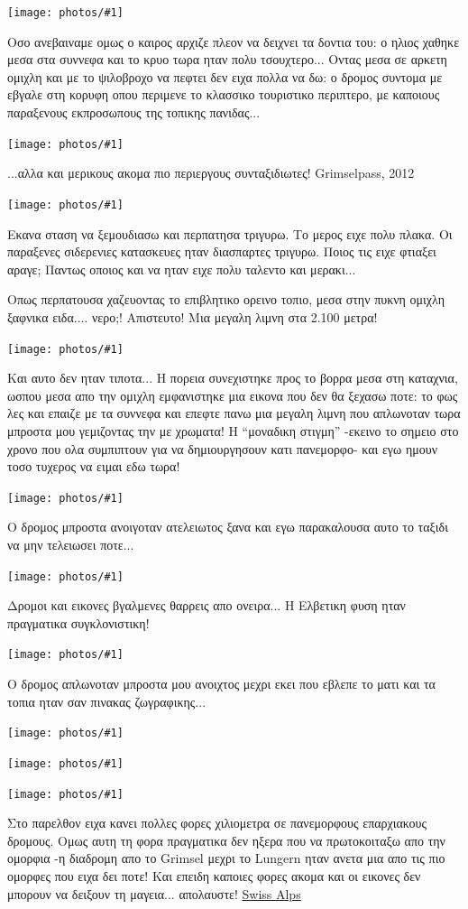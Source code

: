 \documentclass[11pt, letterpaper]{book}
\newcommand\photo[1]{\begin{center}\noindent\texttt{[image: photos/\#1]}\end{center}}
\begin{document}
\photo{63.jpg}

Οσο ανεβαιναμε ομως ο καιρος αρχιζε πλεον να δειχνει τα δοντια του: ο ηλιος χαθηκε μεσα στα συννεφα και το κρυο τωρα ηταν πολυ τσουχτερο... 
Οντας μεσα σε αρκετη ομιχλη και με το ψιλοβροχο να πεφτει δεν ειχα πολλα να δω: ο δρομος συντομα με εβγαλε στη κορυφη οπου περιμενε το κλασσικο τουριστικο περιπτερο, με καποιους παραξενους εκπροσωπους της τοπικης πανιδας...

\photo{64.jpg}

...αλλα και μερικους ακομα πιο περιεργους συνταξιδιωτες!
Grimselpass, 2012

\photo{65.jpg}

Εκανα σταση να ξεμουδιασω και περπατησα τριγυρω. Το μερος ειχε πολυ πλακα. Οι παραξενες σιδερενιες κατασκευες ηταν διασπαρτες τριγυρω. Ποιος τις ειχε φτιαξει αραγε; Παντως οποιος και να ηταν ειχε πολυ ταλεντο και μερακι...

Οπως περπατουσα χαζευοντας το επιβλητικο ορεινο τοπιο, μεσα στην πυκνη ομιχλη ξαφνικα ειδα.... νερο;! Απιστευτο! Μια μεγαλη λιμνη στα 2.100 μετρα! 

\photo{66.jpg}

Και αυτο δεν ηταν τιποτα...
Η πορεια συνεχιστηκε προς το βορρα μεσα στη καταχνια, ωσπου μεσα απο την ομιχλη εμφανιστηκε μια εικονα που δεν θα ξεχασω ποτε: το φως λες και επαιζε με τα συννεφα και επεφτε πανω μια μεγαλη λιμνη που απλωνοταν τωρα μπροστα μου γεμιζοντας την με χρωματα! 
Η ``μοναδικη στιγμη'' -εκεινο το σημειο στο χρονο που ολα συμπιπτουν για να δημιουργησουν κατι πανεμορφο- και εγω ημουν τοσο τυχερος να ειμαι εδω τωρα!

\photo{67.jpg}

Ο δρομος μπροστα ανοιγοταν ατελειωτος ξανα και εγω παρακαλουσα αυτο το ταξιδι να μην τελειωσει ποτε...

\photo{68.jpg}

Δρομοι και εικονες βγαλμενες θαρρεις απο ονειρα... Η Ελβετικη φυση ηταν πραγματικα συγκλονιστικη!

\photo{69.jpg}

Ο δρομος απλωνοταν μπροστα μου ανοιχτος μεχρι εκει που εβλεπε το ματι και τα τοπια ηταν σαν πινακας ζωγραφικης...

\photo{70.jpg}
\photo{71.jpg}
\photo{72.jpg}

Στο παρελθον ειχα κανει πολλες φορες χιλιομετρα σε πανεμορφους επαρχιακους δρομους. Ομως αυτη τη φορα πραγματικα δεν ηξερα που να πρωτοκοιταξω απο την ομορφια -η διαδρομη απο το Grimsel μεχρι το Lungern ηταν ανετα μια απο τις πιο ομορφες που ειχα δει ποτε! Και επειδη καποιες φορες ακομα και οι εικονες δεν μπορουν να δειξουν τη μαγεια... απολαυστε! \href{http://www.youtube.com/watch?v=UuPvab4E5ZI}{Swiss Alps}
\end{document}
